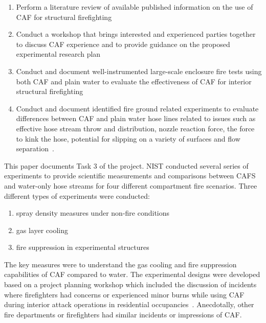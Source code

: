 \documentclass[12pt,oneside]{book}
\begin{document}
\begin{enumerate}
\item  Perform a literature review of available published information on the use of CAF for structural firefighting~\cite{Mitchell:1}
\item  Conduct a workshop that brings interested and experienced parties together to discuss CAF experience and to provide guidance on the proposed experimental research plan~\cite{Grant:2011} 
\item  Conduct and document well-instrumented large-scale enclosure fire tests using both CAF and plain water to evaluate the effectiveness of CAF for interior structural firefighting
\item  Conduct and document identified fire ground related experiments to evaluate differences between CAF and plain water hose lines related to issues such as effective hose stream throw and distribution, nozzle reaction force, the force to kink the hose, potential for slipping on a variety of surfaces and flow separation~\cite{Carracino:2013,Dicus:2013,LaPolla:2012}. 
\end{enumerate}

This paper documents Task 3 of the project. NIST conducted several series of experiments to provide scientific measurements and comparisons between CAFS and water-only hose streams for four different compartment fire scenarios.  Three different types of experiments were conducted:
\begin{enumerate}
\item spray density measures under non-fire conditions
\item gas layer cooling
\item fire suppression in experimental structures
\end{enumerate}

The key measures were to understand the gas cooling and fire suppression capabilities of CAF compared to water. The experimental designs were developed based on a project planning workshop which included the discussion of incidents where firefighters had concerns or experienced minor burns while using CAF during interior attack operations in residential occupancies~\cite{Grant:2011}. Anecdotally, other fire departments or firefighters had similar incidents or impressions of CAF.
\end{document}
